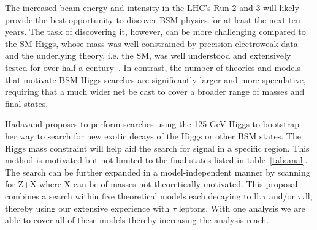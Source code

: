 
The increased beam energy and intensity in the LHC’s Run 2 and 3 will likely provide the best 
opportunity to discover BSM physics for at least the next ten years.
The task of discovering it, however, can be more challenging compared to the SM Higgs, whose mass was well constrained by precision electroweak data and the underlying theory, i.e. the SM, 
was well understood and extensively tested for over half a century~\cite{eng,higgs1,higgs2,higgs3}. 
In contrast, the number of theories and models that motivate BSM Higgs searches are significantly larger and more speculative, requiring that a much wider net be cast to cover a broader range of masses and final states. 

Hadavand proposes to perform searches using the 125 GeV Higgs to bootstrap her way to search for new exotic decays of the Higgs or other BSM states.  
The Higgs mass constraint will help aid the search for signal in a specific region.  %
This method is motivated but not limited to the final states listed in table~\ref{tab:anal}. The search can be further expanded in a model-independent manner by scanning for Z+X where X can be of masses not theoretically motivated.
This proposal combines a search within five theoretical models each decaying to ll$\tau\tau$ and/or $\tau\tau$ll, thereby using our extensive experience with $\tau$ leptons.  With one analysis we are able to
cover all of these models thereby increasing the analysis reach.  

